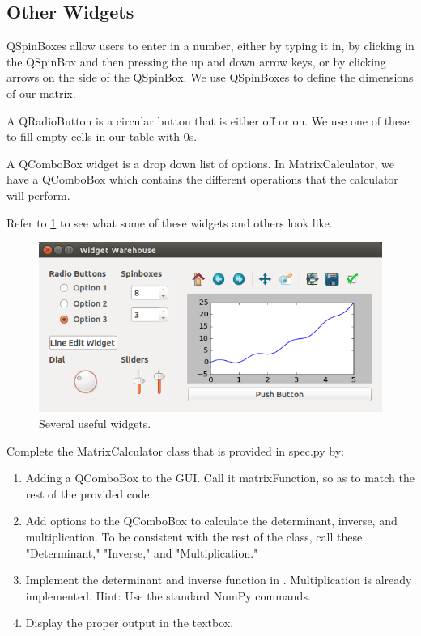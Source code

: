 \subsection*{Other Widgets}
QSpinBoxes allow users to enter in a number, either by typing it in, by clicking in the QSpinBox and then pressing the up and down arrow keys, or by clicking arrows on the side of the QSpinBox.  We use QSpinBoxes to define the dimensions of our matrix.

A QRadioButton is a circular button that is either off or on.  We use one of these to fill empty cells in our table with 0s.

A QComboBox widget is a drop down list of options.  In MatrixCalculator, we have a QComboBox which contains the different operations that the calculator will perform.

Refer to \ref{fig:widgets} to see what some of these widgets and others look like.  

\begin{figure}
\label{fig:widgets}
\includegraphics[width=\textwidth]{widgetwarehouse.png}
\caption{Several useful widgets.}

\end{figure}

\begin{problem}
Complete the MatrixCalculator class that is provided in spec.py by:
\begin{enumerate}
\item Adding a QComboBox to the GUI.  Call it matrixFunction, so as to match the rest of the provided code.
\item Add options to the QComboBox to calculate the determinant, inverse, and multiplication.  To be consistent with the rest of the class, call these "Determinant," "Inverse," and "Multiplication."
\item Implement the determinant and inverse function in .  Multiplication is already implemented.  Hint: Use the standard NumPy commands.
\item Display the proper output in the textbox.
\end{enumerate}
\end{problem}

